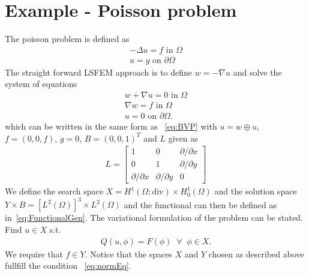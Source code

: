 \section{Example - Poisson problem}

The poisson problem is defined as 
\begin{align}
	-\Delta u = f \text{ in } \Omega \\
	u = g \text{ on } \partial \Omega
	\label{eq:Poisson}
\end{align}
The straight forward LSFEM approach is to define $w = -\nabla u$ and solve the system of equations 
\begin{align}
	w + \nabla u = 0 \text{ in } \Omega \\
	\nabla w = f \text{ in } \Omega \\
	u = 0 \text{ on } \partial \Omega.
	\label{eq:PoissonSystem}
\end{align}
which can be written in the same form as ~\ref{eq:BVP} with $ u = w \oplus u $, $f = (0,0,f)$, $g=0$, $B = (0,0,1)^T $ and $L$ given as 
\begin{align}
	L =
	\begin{bmatrix}
		1 & 0 & \partial / \partial x  \\
		0 & 1 & \partial / \partial y  \\
		\partial / \partial x & \partial/ \partial y  & 0
	\end{bmatrix}
	\label{eq:Amatrix}
\end{align}
We define the search space $X =  H^1(\Omega;\text{div}) \times H_0^1(\Omega)$ and the solution space $Y \times B  = [L^2(\Omega)]^3\times L^2(\Omega) $ and the functional can then be defined as in~\ref{eq:FunctionalGen}. The variational formulation of the problem can be stated. Find $ u \in X $ s.t.
\begin{align}
	Q(u,\phi) = F(\phi) \;\; \forall \;\; \phi \in X.
	\label{eq:VariationalFormulationPoisson}
\end{align}
We require that $f \in Y$.
Notice that the spaces $X$ and $Y$ chosen as described above fullfill the condition ~\ref{eq:normEq}. 

%

